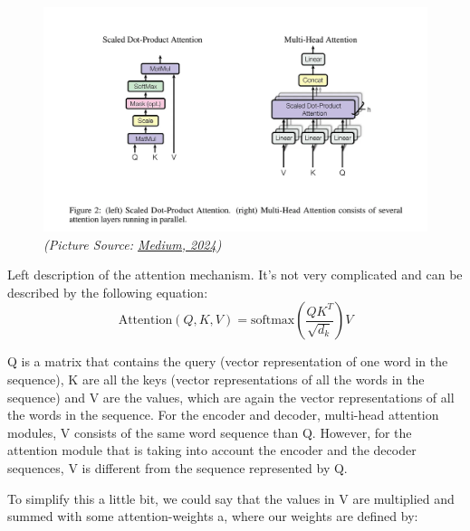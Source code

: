 \begin{figure}[H]
\centering
\includegraphics [scale=0.33]{img/transformer/transformer.png}
{\textit{(Picture Source: \href{https://medium.com/@tomiwaojo7910/decoding-the-transformer-architecture-revolutionizing-neural-networks-and-unveiling-components-61dedc49c24b}{Medium, 2024})}}

\end{figure}


Left description of the attention mechanism. It’s not very complicated and can be described by the following equation:
\begin{equation}
\text{Attention}(Q, K, V) = \text{softmax}\left(\frac{QK^T}{\sqrt{d_k}}\right) V
\end{equation}





Q is a matrix that contains the query (vector representation of one word in the sequence), K are all the keys (vector representations of all the words in the sequence) and V are the values, which are again the vector representations of all the words in the sequence. For the encoder and decoder, multi-head attention modules, V consists of the same word sequence than Q. However, for the attention module that is taking into account the encoder and the decoder sequences, V is different from the sequence represented by Q.

To simplify this a little bit, we could say that the values in V are multiplied and summed with some attention-weights a, where our weights are defined by:


